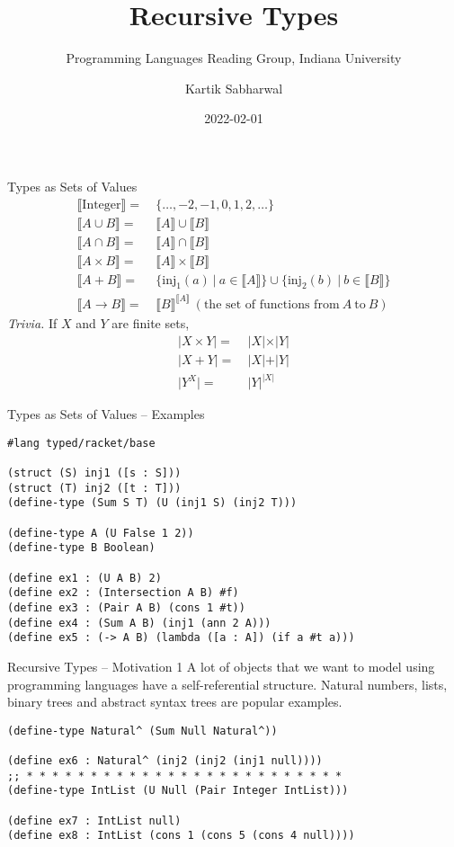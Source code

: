 \documentclass[hyperref={colorlinks = true, urlcolor = blue},pdf]{beamer}
\title{Recursive Types}
\subtitle{Programming Languages Reading Group, Indiana University}
\author{Kartik Sabharwal}
\date{2022-02-01}
\newcommand{\Semantic}[1]{\llbracket {#1} \rrbracket}
\newcommand{\Size}[1]{\vert {#1} \vert}
\begin{document}
\begin{frame}
  \titlepage
\end{frame}
\begin{frame}{Types as Sets of Values}
  \begin{align*}
    \Semantic{\text{Integer}} =\ &
    \{ \ldots, -2, -1, 0, 1, 2, \ldots \} \\
    \Semantic{A \cup B} =\ &
    \Semantic{A} \cup \Semantic{B} \\
    \Semantic{A \cap B} =\ &
    \Semantic{A} \cap \Semantic{B} \\
    \Semantic{A \times B} =\ &
    \Semantic{A} \times \Semantic{B} \\
    \Semantic{A + B} =\ &
    \{ \text{inj}_1(a) \ \vert\ a \in \Semantic{A} \} \cup
    \{ \text{inj}_2(b) \ \vert\ b \in \Semantic{B} \} \\
    \Semantic{A \rightarrow B} =\ &
    \Semantic{B}^{\Semantic{A}}\
    (\text{the set of functions from}\ A\ \text{to}\ B)
  \end{align*}
  \textit{Trivia.} If $X$ and $Y$ are finite sets,
  \begin{align*}
    \Size{X \times Y} =\ & \Size{X} \times \Size{Y} \\
    \Size{X + Y} =\ & \Size{X} + \Size{Y} \\
    \Size{Y^X} =\ & {\Size{Y}}^{\Size{X}}
  \end{align*}
\end{frame}
\begin{frame}[fragile]{Types as Sets of Values -- Examples}
\begin{verbatim}
#lang typed/racket/base

(struct (S) inj1 ([s : S]))
(struct (T) inj2 ([t : T]))
(define-type (Sum S T) (U (inj1 S) (inj2 T)))

(define-type A (U False 1 2)) 
(define-type B Boolean)

(define ex1 : (U A B) 2)
(define ex2 : (Intersection A B) #f)
(define ex3 : (Pair A B) (cons 1 #t))
(define ex4 : (Sum A B) (inj1 (ann 2 A)))
(define ex5 : (-> A B) (lambda ([a : A]) (if a #t a)))
\end{verbatim}
\end{frame}
\begin{frame}[fragile]{Recursive Types -- Motivation 1}
  A lot of objects that we want to model using programming languages have a
  self-referential structure. Natural numbers, lists, binary trees and abstract
  syntax trees are popular examples.

\begin{verbatim}
(define-type Natural^ (Sum Null Natural^))

(define ex6 : Natural^ (inj2 (inj2 (inj1 null))))
;; * * * * * * * * * * * * * * * * * * * * * * * * *
(define-type IntList (U Null (Pair Integer IntList)))

(define ex7 : IntList null)
(define ex8 : IntList (cons 1 (cons 5 (cons 4 null))))
\end{verbatim}
\end{frame}
\end{document}
